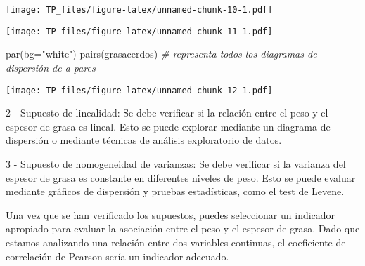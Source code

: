\documentclass[
]{article}
\newenvironment{Shaded}{\begin{snugshade}}{\end{snugshade}}
\newcommand{\AttributeTok}[1]{\textcolor[rgb]{0.77,0.63,0.00}{#1}}
\newcommand{\CommentTok}[1]{\textcolor[rgb]{0.56,0.35,0.01}{\textit{#1}}}
\newcommand{\DecValTok}[1]{\textcolor[rgb]{0.00,0.00,0.81}{#1}}
\newcommand{\FunctionTok}[1]{\textcolor[rgb]{0.00,0.00,0.00}{#1}}
\newcommand{\NormalTok}[1]{#1}
\newcommand{\SpecialCharTok}[1]{\textcolor[rgb]{0.00,0.00,0.00}{#1}}
\newcommand{\StringTok}[1]{\textcolor[rgb]{0.31,0.60,0.02}{#1}}
\begin{document}
\texttt{[image: TP\_files/figure-latex/unnamed-chunk-10-1.pdf]}

\begin{Shaded}
\end{Shaded}

\texttt{[image: TP\_files/figure-latex/unnamed-chunk-11-1.pdf]}

\begin{Shaded}
\begin{Highlighting}[]
\FunctionTok{par}\NormalTok{(}\AttributeTok{bg=}\StringTok{"white"}\NormalTok{)}
\FunctionTok{pairs}\NormalTok{(grasacerdos) }\CommentTok{\# representa todos los diagramas de dispersión de a pares}
\end{Highlighting}
\end{Shaded}

\texttt{[image: TP\_files/figure-latex/unnamed-chunk-12-1.pdf]}

2 - Supuesto de linealidad: Se debe verificar si la relación entre el
peso y el espesor de grasa es lineal. Esto se puede explorar mediante un
diagrama de dispersión o mediante técnicas de análisis exploratorio de
datos.

3 - Supuesto de homogeneidad de varianzas: Se debe verificar si la
varianza del espesor de grasa es constante en diferentes niveles de
peso. Esto se puede evaluar mediante gráficos de dispersión y pruebas
estadísticas, como el test de Levene.

Una vez que se han verificado los supuestos, puedes seleccionar un
indicador apropiado para evaluar la asociación entre el peso y el
espesor de grasa. Dado que estamos analizando una relación entre dos
variables continuas, el coeficiente de correlación de Pearson sería un
indicador adecuado.
\end{document}
